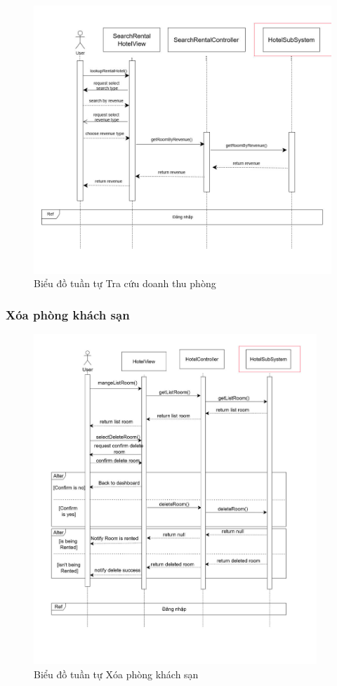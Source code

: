 \begin{figure}[H]
    \centering
    \includegraphics[width=\textwidth]{img3.4/tracuutheodoanhthu.jpg} 
    \caption{Biểu đồ tuần tự Tra cứu doanh thu phòng}
\end{figure}

\subsubsection{Xóa phòng khách sạn}
\begin{figure}[H]
    \centering
    \includegraphics[width=0.95\textwidth]{img3.4/xoaphong.jpg} 
    \caption{Biểu đồ tuần tự Xóa phòng khách sạn}
\end{figure}

